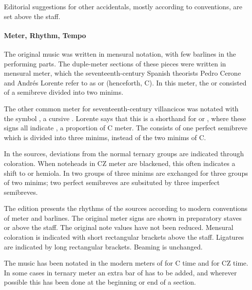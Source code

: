 Editorial suggestions for other accidentals, mostly according to  conventions, are set above the staff.

\paragraph{Meter, Rhythm, Tempo}
The original music was written in mensural notation, with few barlines in the 
performing parts. 
The duple-meter sections of these pieces were written in mensural \meterC{} 
meter, which the seventeenth-century Spanish theorists Pedro Cerone and Andrés 
Lorente refer to as  or  
(henceforth, C).%
  \autocites[537]{Cerone:Melopeo}[156, 210]{Lorente:Porque}
In this meter, the  or  consisted of a semibreve 
divided into two minims.%
  \autocites{GonzalezValle:MusicaTexto}{GonzalezValle:CompasCabezon}

The other common meter for seventeenth-century villancicos was notated with the 
symbol \meterCZorig{}, a cursive \meterCZ{}.
Lorente says that this is a shorthand for \meterCThree{} or \meterCThreeTwo{}, 
where these signs all indicate , a 
proportion of C meter.%
  \autocite[165]{Lorente:Porque}
The  consists of one perfect semibreve which is divided into three 
minims, instead of the two minims of C.

In the sources, deviations from the normal ternary groups are indicated through 
coloration. 
When noteheads in CZ meter are blackened, this often indicates a shift to 
 or hemiola.
In  two groups of three minims are exchanged for three 
groups of two minims; two perfect semibreves are subsituted by three imperfect 
semibreves.

The edition presents the rhythms of the sources according to modern conventions 
of meter and barlines.
The original meter signs are shown in preparatory staves or above the staff.
The original note values have not been reduced.
Mensural coloration is indicated with short rectangular brackets above the 
staff.
Ligatures are indicated by long rectangular brackets.
Beaming is unchanged.

The music has been notated in the modern meters of  for C time and 
 for CZ time.
In some cases in ternary meter an extra bar of  has to be added, 
and wherever possible this has been done at the beginning or end of a section.

